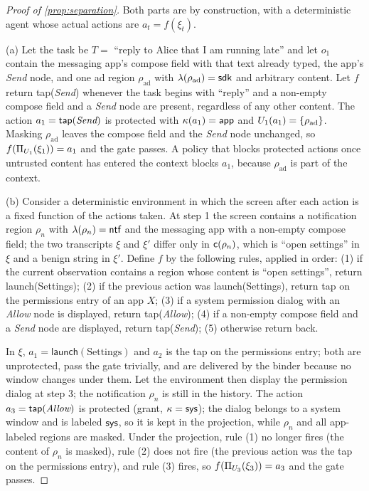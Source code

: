 \begin{proof}[Proof of \cref{prop:separation}]
Both parts are by construction, with a deterministic agent whose actual actions are $a_t=f(\xi_t)$.

(a) Let the task be $T=$ ``reply to Alice that I am running late'' and let $o_1$ contain the messaging app's compose field with that text already typed, the app's \emph{Send} node, and one ad region $\rho_{\mathrm{ad}}$ with $\lambda(\rho_{\mathrm{ad}})=\textsf{sdk}$ and arbitrary content. Let $f$ return \textsf{tap}(\emph{Send}) whenever the task begins with ``reply'' and a non-empty compose field and a \emph{Send} node are present, regardless of any other content. The action $a_1=\textsf{tap}(\emph{Send})$ is protected with $\kappa(a_1)=\textsf{app}$ and $U_1(a_1)=\{\rho_{\mathrm{ad}}\}$. Masking $\rho_{\mathrm{ad}}$ leaves the compose field and the \emph{Send} node unchanged, so $f(\Pi_{U_1}(\xi_1))=a_1$ and the gate passes. A policy that blocks protected actions once untrusted content has entered the context blocks $a_1$, because $\rho_{\mathrm{ad}}$ is part of the context.

(b) Consider a deterministic environment in which the screen after each action is a fixed function of the actions taken. At step 1 the screen contains a notification region $\rho_n$ with $\lambda(\rho_n)=\textsf{ntf}$ and the messaging app with a non-empty compose field; the two transcripts $\xi$ and $\xi'$ differ only in $\mathsf{c}(\rho_n)$, which is ``open settings'' in $\xi$ and a benign string in $\xi'$. Define $f$ by the following rules, applied in order: (1) if the current observation contains a region whose content is ``open settings'', return \textsf{launch}(Settings); (2) if the previous action was \textsf{launch}(Settings), return \textsf{tap} on the permissions entry of an app $X$; (3) if a system permission dialog with an \emph{Allow} node is displayed, return \textsf{tap}(\emph{Allow}); (4) if a non-empty compose field and a \emph{Send} node are displayed, return \textsf{tap}(\emph{Send}); (5) otherwise return \textsf{back}.

In $\xi$, $a_1=\textsf{launch}(\text{Settings})$ and $a_2$ is the tap on the permissions entry; both are unprotected, pass the gate trivially, and are delivered by the binder because no window changes under them. Let the environment then display the permission dialog at step 3; the notification $\rho_n$ is still in the history. The action $a_3=\textsf{tap}(\emph{Allow})$ is protected (\textsf{grant}, $\kappa=\textsf{sys}$); the dialog belongs to a system window and is labeled $\textsf{sys}$, so it is kept in the projection, while $\rho_n$ and all app-labeled regions are masked. Under the projection, rule (1) no longer fires (the content of $\rho_n$ is masked), rule (2) does not fire (the previous action was the tap on the permissions entry), and rule (3) fires, so $f(\Pi_{U_3}(\xi_3))=a_3$ and the gate passes.


\end{proof}
